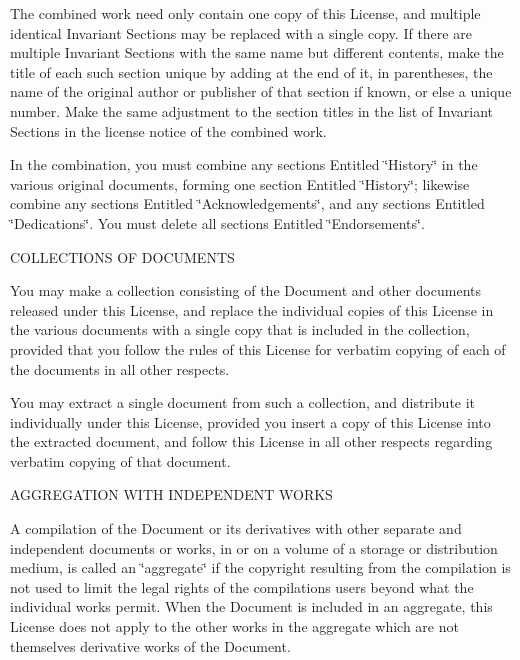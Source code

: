 The combined work need only contain one copy of this License, and multiple identical Invariant Sections may be replaced with a single copy. If there are multiple Invariant Sections with the same name but different contents, make the title of each such section unique by adding at the end of it, in parentheses, the name of the original author or publisher of that section if known, or else a unique number. Make the same adjustment to the section titles in the list of Invariant Sections in the license notice of the combined work.

In the combination, you must combine any sections Entitled \char`\"{}\+History\char`\"{} in the various original documents, forming one section Entitled \char`\"{}\+History\char`\"{}; likewise combine any sections Entitled \char`\"{}\+Acknowledgements\char`\"{}, and any sections Entitled \char`\"{}\+Dedications\char`\"{}. You must delete all sections Entitled \char`\"{}\+Endorsements\char`\"{}.


\begin{DoxyEnumerate}
\item C\+O\+L\+L\+E\+C\+T\+I\+O\+NS OF D\+O\+C\+U\+M\+E\+N\+TS
\end{DoxyEnumerate}

You may make a collection consisting of the Document and other documents released under this License, and replace the individual copies of this License in the various documents with a single copy that is included in the collection, provided that you follow the rules of this License for verbatim copying of each of the documents in all other respects.

You may extract a single document from such a collection, and distribute it individually under this License, provided you insert a copy of this License into the extracted document, and follow this License in all other respects regarding verbatim copying of that document.


\begin{DoxyEnumerate}
\item A\+G\+G\+R\+E\+G\+A\+T\+I\+ON W\+I\+TH I\+N\+D\+E\+P\+E\+N\+D\+E\+NT W\+O\+R\+KS
\end{DoxyEnumerate}

A compilation of the Document or its derivatives with other separate and independent documents or works, in or on a volume of a storage or distribution medium, is called an \char`\"{}aggregate\char`\"{} if the copyright resulting from the compilation is not used to limit the legal rights of the compilation\textquotesingle{}s users beyond what the individual works permit. When the Document is included in an aggregate, this License does not apply to the other works in the aggregate which are not themselves derivative works of the Document.

